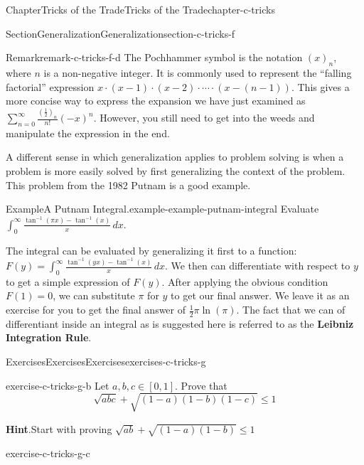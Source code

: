 \documentclass[oneside,10pt,]{book}
\newcommand{\blocktitlefont}{\relax}
\newcommand{\terminology}[1]{\textbf{#1}}
\numberwithin{equation}{section}
\begin{document}
\begin{chapterptx}{Chapter}{Tricks of the Trade}{}{Tricks of the Trade}{}{}{chapter-c-tricks}
\begin{sectionptx}{Section}{Generalization}{}{Generalization}{}{}{section-c-tricks-f}
\begin{remark}{Remark}{}{remark-c-tricks-f-d}
 The Pochhammer symbol is the notation  \((x)_n\), where \(n\) is a non-negative integer. It is commonly used to represent the ``falling factorial'' expression  \(x\cdot(x-1)\cdot(x-2)\cdot \cdots \cdot (x-(n-1))\).  This gives a more concise way to express the expansion we have just examined as \(\sum_{n=0}^{\infty} \frac{(\frac{1}{2})_n}{n!} (-x)^n\).  However, you still need to get into the weeds and manipulate the expression in the end.%
\end{remark}
A different sense in which generalization applies to problem solving is when a problem is more easily solved by first generalizing the context of the problem.  This problem from the 1982 Putnam is a good example.%
\begin{example}{Example}{A Putnam Integral.}{example-example-putnam-integral}%
%
Evaluate \(\int_0^{\infty} \frac{\tan^{-1}(\pi  x)-\tan^{-1}(x)}{x} \, dx\).%
\par
The integral can be evaluated by generalizing it first to a function: \(F(y)=\int_0^{\infty} \frac{\tan ^{-1}(y x)-\tan ^{-1}(x)}{x} \, dx\). We then can differentiate with respect to \(y\) to get a simple expression of \(F(y)\).  After applying the obvious condition \(F(1)=0\), we can substitute \(\pi\) for \(y\) to get our final answer.  We leave it as an exercise for you to get the final answer of \(\frac{1}{2} \pi  \ln(\pi )\).   The fact that we can of differentiant inside an integral as is suggested here is referred to as the \terminology{Leibniz Integration Rule}.%
\end{example}
\end{sectionptx}
%
%
\typeout{************************************************}
\typeout{************************************************}
%
\begin{exercises-section}{Exercises}{Exercises}{}{Exercises}{}{}{exercises-c-tricks-g}
\begin{divisionexercise}{1}{}{}{exercise-c-tricks-g-b}%
Let \(a, b, c \in [0, 1]\). Prove that%
\begin{equation*}
\sqrt{a b c}+ \sqrt{(1-a)(1-b)(1-c)} \leq 1
\end{equation*}
%
\par\smallskip%
\noindent\textbf{\blocktitlefont Hint}.\hypertarget{hint-c-tricks-g-b-b}{}\quad{}Start with proving  \(\sqrt{a b}+ \sqrt{(1-a)(1-b)} \leq 1\)%
\end{divisionexercise}%
\begin{divisionexercise}{2}{}{}{exercise-c-tricks-g-c}%

\end{divisionexercise}
\end{exercises-section}
\end{chapterptx}
\end{document}
